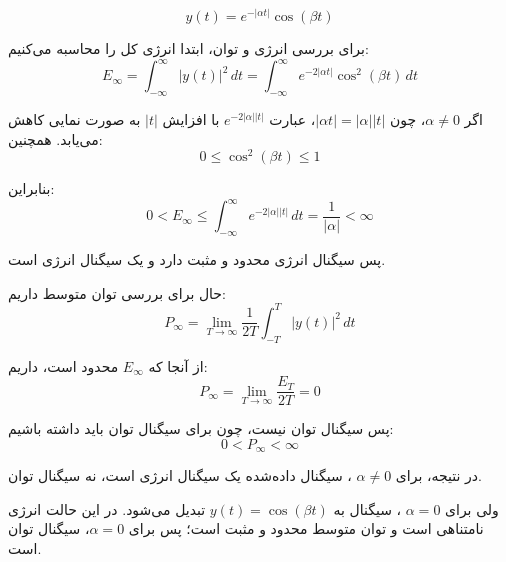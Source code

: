 \[
y(t) = e^{-|\alpha t|}\cos(\beta t)
\]

برای بررسی انرژی و توان، ابتدا انرژی کل را محاسبه می‌کنیم:
\[
E_{\infty} = \int_{-\infty}^{\infty} |y(t)|^2\,dt = \int_{-\infty}^{\infty} e^{-2|\alpha t|}\cos^2(\beta t)\,dt
\]


اگر \(\alpha \neq 0\)، چون \(|\alpha t|=|\alpha||t|\)، عبارت \(e^{-2|\alpha||t|}\) با افزایش \(|t|\) به صورت نمایی کاهش می‌یابد. همچنین:
\[
0 \le \cos^2(\beta t) \le 1
\]

بنابراین:
\[
0 < E_{\infty}
\le
\int_{-\infty}^{\infty} e^{-2|\alpha||t|}\,dt
=
\frac{1}{|\alpha|}
< \infty
\]

پس سیگنال انرژی محدود و مثبت دارد و یک سیگنال انرژی است.

حال برای بررسی توان متوسط داریم:
\[
P_{\infty}
=
\lim_{T\to\infty}
\frac{1}{2T}
\int_{-T}^{T} |y(t)|^2\,dt
\]

از آنجا که \(E_{\infty}\) محدود است، داریم:
\[
P_{\infty}
=
\lim_{T\to\infty}
\frac{E_T}{2T}
=0
\]

پس سیگنال توان نیست، چون برای سیگنال توان باید داشته باشیم:
\[
0 < P_{\infty} < \infty
\]

در نتیجه، برای \(\alpha \neq 0\) ، سیگنال داده‌شده یک سیگنال انرژی است، نه سیگنال توان.

ولی برای \(\alpha=0\) ، سیگنال به \(y(t)=\cos(\beta t)\) تبدیل می‌شود. در این حالت انرژی نامتناهی است و توان متوسط محدود و مثبت است؛ پس برای \(\alpha=0\)، سیگنال توان است.